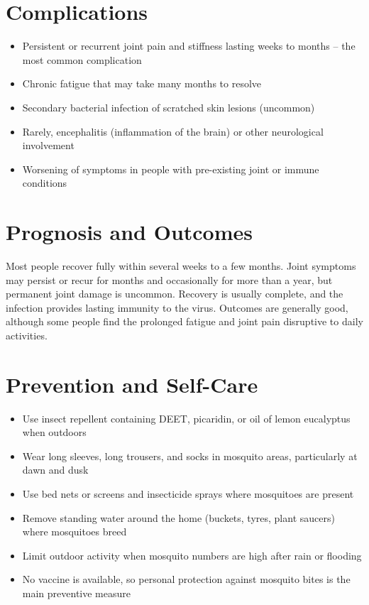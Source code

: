 \section*{Complications}
\begin{itemize}
    \item Persistent or recurrent joint pain and stiffness lasting weeks to months -- the most common complication
    \item Chronic fatigue that may take many months to resolve
    \item Secondary bacterial infection of scratched skin lesions (uncommon)
    \item Rarely, encephalitis (inflammation of the brain) or other neurological involvement
    \item Worsening of symptoms in people with pre-existing joint or immune conditions
\end{itemize}

\section*{Prognosis and Outcomes}
Most people recover fully within several weeks to a few months. Joint symptoms may persist or recur for months and occasionally for more than a year, but permanent joint damage is uncommon. Recovery is usually complete, and the infection provides lasting immunity to the virus. Outcomes are generally good, although some people find the prolonged fatigue and joint pain disruptive to daily activities.

\section*{Prevention and Self-Care}
\begin{itemize}
    \item Use insect repellent containing DEET, picaridin, or oil of lemon eucalyptus when outdoors
    \item Wear long sleeves, long trousers, and socks in mosquito areas, particularly at dawn and dusk
    \item Use bed nets or screens and insecticide sprays where mosquitoes are present
    \item Remove standing water around the home (buckets, tyres, plant saucers) where mosquitoes breed
    \item Limit outdoor activity when mosquito numbers are high after rain or flooding
    \item No vaccine is available, so personal protection against mosquito bites is the main preventive measure
\end{itemize}

